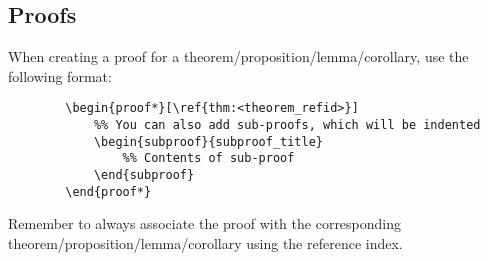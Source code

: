 \subsection{Proofs}
\begin{definition}
    \noindent When creating a proof for a theorem/proposition/lemma/corollary, use the following format:
    
    \begin{lstlisting}
        \begin{proof*}[\ref{thm:<theorem_refid>}]    
            %% You can also add sub-proofs, which will be indented
            \begin{subproof}{subproof_title}
                %% Contents of sub-proof
            \end{subproof}
        \end{proof*}
    \end{lstlisting}
    Remember to always associate the proof with the corresponding theorem/proposition/lemma/corollary using the reference index.    
\end{definition}
\fi